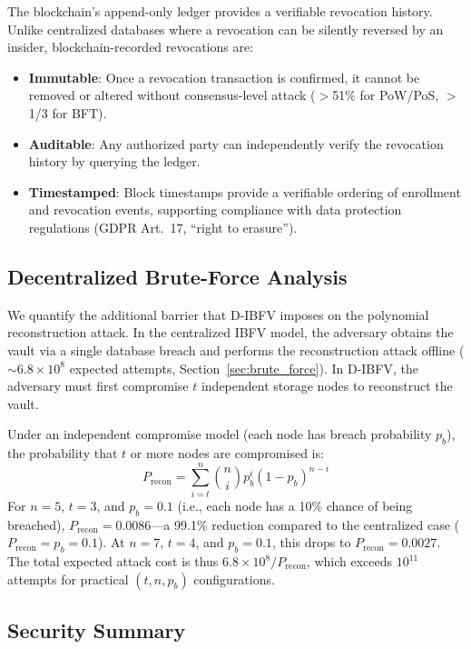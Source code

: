 \documentclass[3p,twocolumn]{elsarticle}
\newcommand{\IBFV}{\textsf{IBFV}}
\newcommand{\DIBFV}{\textsf{D-IBFV}}
\begin{document}
The blockchain's append-only ledger provides a verifiable revocation history. Unlike centralized databases where a revocation can be silently reversed by an insider, blockchain-recorded revocations are:
\begin{itemize}
    \item \textbf{Immutable}: Once a revocation transaction is confirmed, it cannot be removed or altered without consensus-level attack ($>$51\% for PoW/PoS, $>$1/3 for BFT).
    \item \textbf{Auditable}: Any authorized party can independently verify the revocation history by querying the ledger.
    \item \textbf{Timestamped}: Block timestamps provide a verifiable ordering of enrollment and revocation events, supporting compliance with data protection regulations (GDPR Art.~17, ``right to erasure'').
\end{itemize}

\subsection{Decentralized Brute-Force Analysis}
\label{sec:decentral_brute}

We quantify the additional barrier that \DIBFV{} imposes on the polynomial reconstruction attack. In the centralized \IBFV{} model, the adversary obtains the vault via a single database breach and performs the reconstruction attack offline ($\sim\!6.8 \times 10^{8}$ expected attempts, Section~\ref{sec:brute_force}). In \DIBFV{}, the adversary must first compromise $t$ independent storage nodes to reconstruct the vault.

Under an independent compromise model (each node has breach probability $p_b$), the probability that $t$ or more nodes are compromised is:
\begin{equation}
    P_{\text{recon}} = \sum_{i=t}^{n} \binom{n}{i} p_b^i (1 - p_b)^{n-i}
\end{equation}
For $n = 5$, $t = 3$, and $p_b = 0.1$ (i.e., each node has a 10\% chance of being breached), $P_{\text{recon}} = 0.0086$---a 99.1\% reduction compared to the centralized case ($P_{\text{recon}} = p_b = 0.1$). At $n = 7$, $t = 4$, and $p_b = 0.1$, this drops to $P_{\text{recon}} = 0.0027$. The total expected attack cost is thus $6.8 \times 10^{8} / P_{\text{recon}}$, which exceeds $10^{11}$ attempts for practical $(t, n, p_b)$ configurations.

\subsection{Security Summary}
\label{sec:security_summary}
\end{document}
